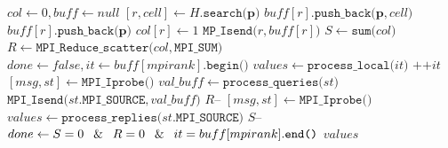 \begin{algorithm}[htbp]
\caption{$values \gets \texttt{Interpolate (}H, \mathbf{X}\texttt{)}$} %
\begin{algorithmic}[1]
\State $col \gets 0, buff \gets null$ 
	\State $[r, cell] \gets H.\texttt{search(}\mathbf{p}\texttt{)}$ 
		\State $buff[r].\texttt{push\_back(}\mathbf{p}, cell\texttt{)}$
	\Else
		\State $buff[r].\texttt{push\_back(}\mathbf{p}\texttt{)}$
		\State $col[r] \gets 1$
	\EndIf
\EndFor
{} 
		\State $\texttt{MP\_Isend(}r, buff[r]\texttt{)}$
	\EndIf
\EndFor
\State  $S \gets \texttt{sum(}col\texttt{)}$ 
\State  $R \gets \texttt{MPI\_Reduce\_scatter(}col,\texttt{MPI\_SUM)}$
\State $done \gets false, it \gets buff[mpirank].\texttt{begin()}$
 
		\State $values \gets \texttt{process\_local(}it\texttt{)}$ 
		\State $\texttt{++}it$
	\EndIf
	 
		\State $[msg, st] \gets \texttt{MPI\_Iprobe()}$
			\State $val\_buff \gets \texttt{process\_queries(}st\texttt{)}$ 
			\State $\texttt{MPI\_Isend(}st.\texttt{MPI\_SOURCE},val\_buff\texttt{)}$ 
			\State $R\texttt{--}$
		\EndIf
	\EndIf
	 
		\State $[msg, st] \gets \texttt{MPI\_Iprobe()}$
			\State $values \gets \texttt{process\_replies(}st.\texttt{MPI\_SOURCE)}$ 
			\State $S\texttt{--}$
		\EndIf
	\EndIf
	\State $done \gets S = 0 \: \And \: R = 0 \: \And \: it = buff[mpirank].\texttt{end()}$
\EndWhile
\State \Return $values$
\end{algorithmic}
\label{alg:interpolation}
\end{algorithm}

